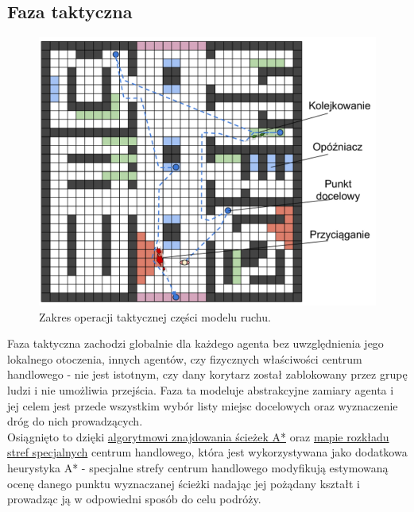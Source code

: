 \documentclass[a4paper, 12pt]{article}
\begin{document}
\newpage
        \subsection{Faza taktyczna}
        \label{sec:tactical}

        \begin{figure}[H]
            \centering
            \includegraphics[scale=0.3]{./img/Tactical.pdf}
            \caption{Zakres operacji taktycznej części modelu ruchu.}
            \label{fig:tactical}
        \end{figure}

\noindent
Faza taktyczna zachodzi globalnie dla każdego agenta bez uwzględnienia jego lokalnego otoczenia, innych agentów, czy fizycznych właściwości centrum handlowego - nie jest istotnym, czy dany korytarz został zablokowany przez grupę ludzi i nie umożliwia przejścia. Faza ta modeluje abstrakcyjne zamiary agenta i jej celem jest przede wszystkim wybór listy miejsc docelowych oraz wyznaczenie dróg do nich prowadzących. \\

Osiągnięto to dzięki \hyperref[sec:path-finding]{algorytmowi znajdowania ścieżek A*} oraz \hyperref[sec:mall-impl]{mapie rozkładu stref specjalnych} centrum handlowego, która jest wykorzystywana jako dodatkowa heurystyka A* - specjalne strefy centrum handlowego modyfikują estymowaną ocenę danego punktu wyznaczanej ścieżki nadając jej pożądany kształt i prowadząc ją w odpowiedni sposób do celu podróży. \\
\end{document}
